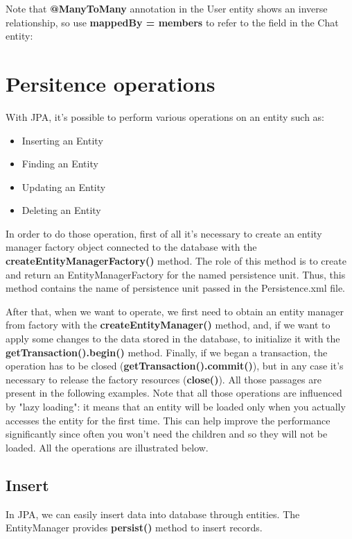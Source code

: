 \documentclass[a4paper]{article}
\begin{document}
Note that \textbf{@ManyToMany} annotation in the User entity shows an inverse relationship, so use \textbf{mappedBy = members} to refer to the field in the Chat entity:


\section{Persitence operations}
With JPA, it's possible to perform various operations on an entity such as:

\begin{itemize}
\item{Inserting an Entity}
\item{Finding an Entity}
\item{Updating an Entity}
\item{Deleting an Entity}
\end{itemize}

In order to do those operation, first of all it's necessary to create an entity manager factory object connected to the database with the \textbf{createEntityManagerFactory()} method. The role of this method is to create and return an EntityManagerFactory for the named persistence unit. Thus, this method contains the name of persistence unit passed in the Persistence.xml file.

After that, when we want to operate, we first need to obtain an entity manager from factory with the \textbf{createEntityManager()} method, and, if we want to apply some changes to the data stored in the database, to initialize it with the \textbf{getTransaction().begin()} method. Finally, if we began a transaction, the operation has to be closed (\textbf{getTransaction().commit()}), but in any case it's necessary to release the factory resources (\textbf{close()}).
All those passages are present in the following examples.
Note that all those operations are influenced by "lazy loading": it means that an entity will be loaded only when you actually accesses the entity for the first time. This can help improve the performance significantly since often you won't need the children and so they will not be loaded.
All the operations are illustrated below.

\subsection{Insert}
In JPA, we can easily insert data into database through entities. The EntityManager provides \textbf{persist()} method to insert records.
\end{document}
